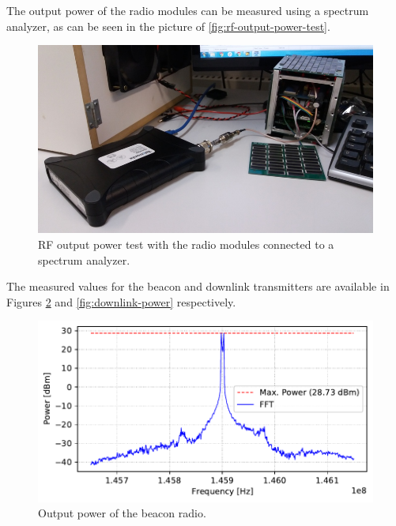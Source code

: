 The output power of the radio modules can be measured using a spectrum analyzer, as can be seen in the picture of \autoref{fig:rf-output-power-test}.

\begin{figure}[!ht]
    \begin{center}
        \includegraphics[width=\textwidth]{figures/rf-output-power-test.jpg}
        \caption{RF output power test with the radio modules connected to a spectrum analyzer.}
        \label{fig:rf-output-power-test}
    \end{center}
\end{figure}

The measured values for the beacon and downlink transmitters are available in Figures \ref{fig:beacon-power} and \ref{fig:downlink-power} respectively.

\begin{figure}[!ht]
    \begin{center}
        \includegraphics[width=\textwidth]{curves/beacon_output_power.pdf}
        \caption{Output power of the beacon radio.}
        \label{fig:beacon-power}
    \end{center}
\end{figure}

